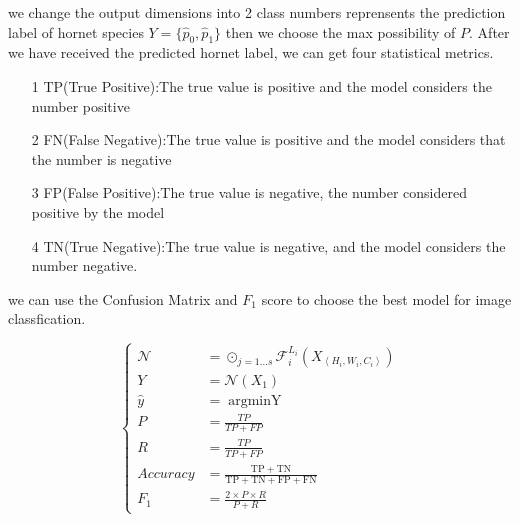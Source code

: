 \documentclass[12pt]{article}
\begin{document}
we change the output dimensions into 2 class numbers reprensents the prediction label of hornet species $ Y = \{ \hat p_0,\hat p_1 \} $ then we choose the max possibility of $P$.
After we have received the predicted hornet label, we can get four statistical  metrics.

\begin{itemize}
	\item[1] TP(True Positive):The true value is positive and the model considers the number positive 
	\item[2] FN(False Negative):The true value is positive and the model considers that the number is negative 
	\item[3] FP(False Positive):The true value is negative, the number considered positive by the model 
	\item[4] TN(True Negative):The true value is negative, and the model considers the number negative.
\end{itemize}

we can use the Confusion Matrix and $F_1$ score to choose the best model for image classfication.

\begin{equation}
	 \begin{cases}
	\mathcal{N}& =\odot_{j=1 \ldots s} \mathcal{F}_{i}^{L_{i}}\left(X_{\left\langle H_{i}, W_{i}, C_{i}\right\rangle}\right) \\
	Y& =\mathcal{N}(X_1) \\
	\hat y &  =\mathop{\arg\min Y} \\
	P & = \frac{TP}{TP+FP} \\
	R & = \frac{TP}{TP+FP} \\
	Accuracy& =\frac{\mathrm{TP}+\mathrm{TN}}{\mathrm{TP}+\mathrm{TN}+\mathrm{FP}+\mathrm{FN}} \\
	F_1 &= \frac{2 \times P \times R}{P+R}
	\end{cases}
\end{equation}
 
	

%

%		
%	
\end{document}
